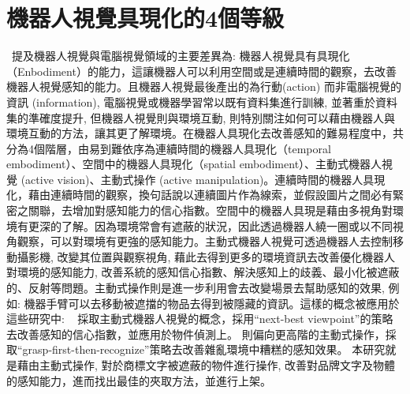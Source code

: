 \section{機器人視覺具現化的4個等級}
~\cite{sunderhauf2018limits}提及機器人視覺與電腦視覺領域的主要差異為: 機器人視覺具有具現化（Enbodiment）的能力，這讓機器人可以利用空間或是連續時間的觀察，去改善機器人視覺感知的能力。且機器人視覺最後產出的為行動(action) 而非電腦視覺的資訊 (information), 電腦視覺或機器學習常以既有資料集進行訓練, 並著重於資料集的準確度提升, 但機器人視覺則與環境互動, 則特別關注如何可以藉由機器人與環境互動的方法，讓其更了解環境。在機器人具現化去改善感知的難易程度中，共分為4個階層，由易到難依序為連續時間的機器人具現化（temporal embodiment）、空間中的機器人具現化（spatial embodiment）、主動式機器人視覺 (active vision)、主動式操作 (active manipulation)。連續時間的機器人具現化，藉由連續時間的觀察，換句話說以連續圖片作為線索，並假設圖片之間必有緊密之關聯，去增加對感知能力的信心指數。空間中的機器人具現是藉由多視角對環境有更深的了解。因為環境常會有遮蔽的狀況，因此透過機器人繞一圈或以不同視角觀察，可以對環境有更強的感知能力。主動式機器人視覺可透過機器人去控制移動攝影機, 改變其位置與觀察視角, 藉此去得到更多的環境資訊去改善優化機器人對環境的感知能力, 改善系統的感知信心指數、解決感知上的歧義、最小化被遮蔽的、反射等問題。主動式操作則是進一步利用會去改變場景去幫助感知的效果, 例如: 機器手臂可以去移動被遮擋的物品去得到被隱藏的資訊。這樣的概念被應用於這些研究中: ~\cite{atanasov2014nonmyopic} \cite{doumanoglou2016recovering} \cite{malmir2017deep}採取主動式機器人視覺的概念，採用``next-best viewpoint''的策略去改善感知的信心指數，並應用於物件偵測上。
 \cite{zeng2018robotic} 則偏向更高階的主動式操作，採取``grasp-first-then-recognize''策略去改善雜亂環境中糟糕的感知效果。
本研究就是藉由主動式操作, 對於商標文字被遮蔽的物件進行操作, 改善對品牌文字及物體的感知能力，進而找出最佳的夾取方法，並進行上架。



